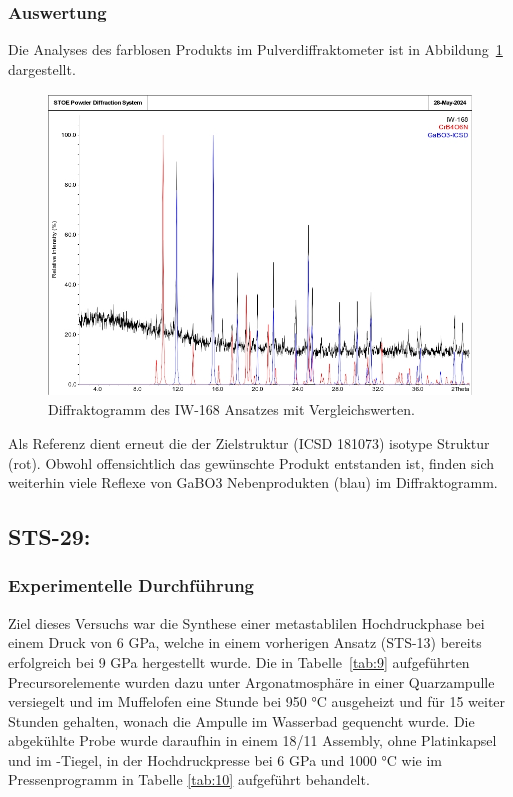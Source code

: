 \documentclass[12pt]{article}
\begin{document}
\subsubsection{Auswertung}
Die Analyses des farblosen Produkts im Pulverdiffraktometer ist in Abbildung~\ref{fig:2} dargestellt.

\begin{figure}[H]
    \centering
    \includegraphics[height=8cm]{Images/168.jpg}
    \caption{Diffraktogramm des IW-168 Ansatzes mit Vergleichswerten.}
    \label{fig:2}
\end{figure}

\noindent Als Referenz dient erneut die der Zielstruktur  (ICSD 181073) isotype 
Struktur (rot). Obwohl offensichtlich das gewünschte Produkt entstanden ist, finden sich weiterhin viele Reflexe von GaBO3 Nebenprodukten (blau) im Diffraktogramm.

\subsection{STS-29: }
\subsubsection{Experimentelle Durchführung}
Ziel dieses Versuchs war die Synthese einer metastablilen  Hochdruckphase bei einem Druck von 6 GPa, welche in einem vorherigen Ansatz (STS-13) bereits erfolgreich bei 9 GPa hergestellt wurde.
Die in Tabelle~\ref{tab:9} aufgeführten Precursorelemente wurden dazu unter Argonatmosphäre in einer Quarzampulle versiegelt und im Muffelofen eine Stunde bei 950 \si{\degreeCelsius} ausgeheizt und für 15 weiter Stunden gehalten, wonach die Ampulle im Wasserbad gequencht wurde.
Die abgekühlte Probe wurde daraufhin in einem 18/11 Assembly, ohne Platinkapsel und im -Tiegel, in der Hochdruckpresse bei 6 GPa und 1000 \si{\degreeCelsius} wie im Pressenprogramm in Tabelle \ref{tab:10} aufgeführt behandelt.
\end{document}
